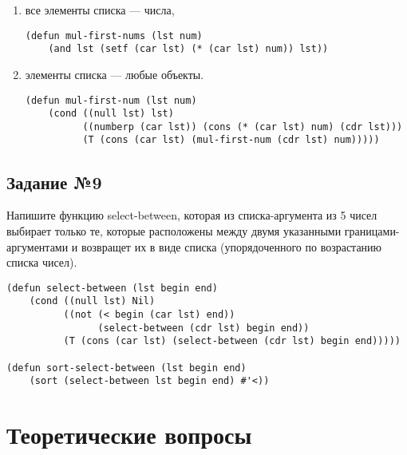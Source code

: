 \begin{enumerate}
    \item все элементы списка --- числа,

\vspace{4mm}
\begin{minipage}{0.92\linewidth}
\begin{lstlisting}
(defun mul-first-nums (lst num)
    (and lst (setf (car lst) (* (car lst) num)) lst))
\end{lstlisting}
\end{minipage}

    \item элементы списка --- любые объекты.

\vspace{4mm}
\begin{minipage}{0.92\linewidth}
\begin{lstlisting}
(defun mul-first-num (lst num)
    (cond ((null lst) lst)
          ((numberp (car lst)) (cons (* (car lst) num) (cdr lst)))
          (T (cons (car lst) (mul-first-num (cdr lst) num)))))
\end{lstlisting}
\end{minipage}

\end{enumerate}

\section{Задание №9}

Напишите функцию select-between, которая из списка-аргумента из 5 чисел
выбирает только те, которые расположены между двумя указанными
границами-аргументами и возвращет их в виде списка (упорядоченного по
возрастанию списка чисел).

\vspace{4mm}
\begin{minipage}{0.92\linewidth}
\begin{lstlisting}
(defun select-between (lst begin end)
    (cond ((null lst) Nil)
          ((not (< begin (car lst) end))
                (select-between (cdr lst) begin end))
          (T (cons (car lst) (select-between (cdr lst) begin end)))))

(defun sort-select-between (lst begin end)
    (sort (select-between lst begin end) #'<))
\end{lstlisting}
\end{minipage}

\chapter{Теоретические вопросы}

